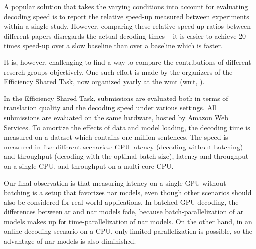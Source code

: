 A popular solution that takes the varying conditions into account for
evaluating decoding speed is to report the relative speed-up measured between
experiments within a single study. However, comparing these relative speed-up
ratios between different papers disregards the actual decoding times -- it is
easier to achieve 20 times speed-up over a slow baseline than over a baseline
which is faster.

It is, however, challenging to find a way to compare the contributions of
different reserch groups objectively. One such effort is made by the organizers
of the Efficiency Shared Task, now organized yearly at the \acl{wmt}
(\acs{wmt}, \citealp{heafield-etal-2020-findings,
  heafield-etal-2021-findings}).

In the Efficiency Shared Task, submissions are evaluated both in terms of
translation quality and the decoding speed under various settings. All
submissions are evaluated on the same hardware, hosted by Amazon Web Services.
To amortize the effects of data and model loading, the decoding time is
measured on a dataset which contains one million sentences. The speed is
measured in five different scenarios: GPU latency (decoding without batching)
and throughput (decoding with the optimal batch size), latency and throughput
on a single CPU, and throughput on a multi-core CPU. 



Our final observation is that measuring latency on a single GPU without
batching is a setup that favorizes \ac{nar} models, even though other scenarios
should also be considered for real-world applications. In batched GPU decoding,
the differences between \ac{ar} and \ac{nar} models fade, because
batch-parallelization of \ac{ar} models makes up for time-parallelization of
\ac{nar} models. On the other hand, in an online decoding scenario on a CPU,
only limited parallelization is possible, so the advantage of \ac{nar} models
is also diminished. 



